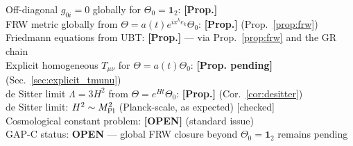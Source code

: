 \documentclass[12pt,a4paper]{article}
\begin{document}
\begin{statusbox}
Off-diagonal $g_{0i}=0$ globally for $\Theta_0=\mathbf{1}_2$: \textbf{[Prop.]}\\
FRW metric globally from $\Theta = a(t)e^{ix^k e_k}\Theta_0$: \textbf{[Prop.]} (Prop.~\ref{prop:frw})\\
Friedmann equations from UBT: \textbf{[Prop.]} — via Prop.~\ref{prop:frw} and the GR chain\\
Explicit homogeneous $T_{\mu\nu}$ for $\Theta=a(t)\Theta_0$: \textbf{[Prop. pending]} (Sec.~\ref{sec:explicit_tmunu})\\
de Sitter limit $\Lambda=3H^2$ from $\Theta=e^{Ht}\Theta_0$: \textbf{[Prop.]} (Cor.~\ref{cor:desitter})\\
de Sitter limit: $H^2 \sim M_{\rm Pl}^2$ (Planck-scale, as expected) [checked]\\
Cosmological constant problem: \textbf{[OPEN]} (standard issue)\\
GAP-C status: \textbf{OPEN} — global FRW closure beyond $\Theta_0=\mathbf{1}_2$ remains pending
\end{statusbox}
\end{document}
